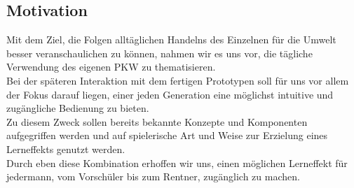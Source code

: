 \documentclass[.../Dokumentation.tex]{subfiles}
\begin{document}
\subsection{Motivation}\label{sec-intr-motivation}
Mit dem Ziel, die Folgen alltäglichen Handelns des Einzelnen für die Umwelt 
besser veranschaulichen zu können, nahmen wir es uns vor, die tägliche 
Verwendung des eigenen PKW zu thematisieren.\\
Bei der späteren Interaktion mit dem fertigen Prototypen soll für uns vor 
allem der Fokus darauf liegen, einer jeden Generation eine möglichst intuitive 
und zugängliche Bedienung zu bieten.\\
Zu diesem Zweck sollen bereits bekannte Konzepte und Komponenten aufgegriffen 
werden und auf spielerische Art und Weise zur Erzielung eines Lerneffekts 
genutzt werden. \\
Durch eben diese Kombination erhoffen wir uns, einen möglichen Lerneffekt 
für jedermann, vom Vorschüler bis zum Rentner, zugänglich zu machen.
\end{document}
